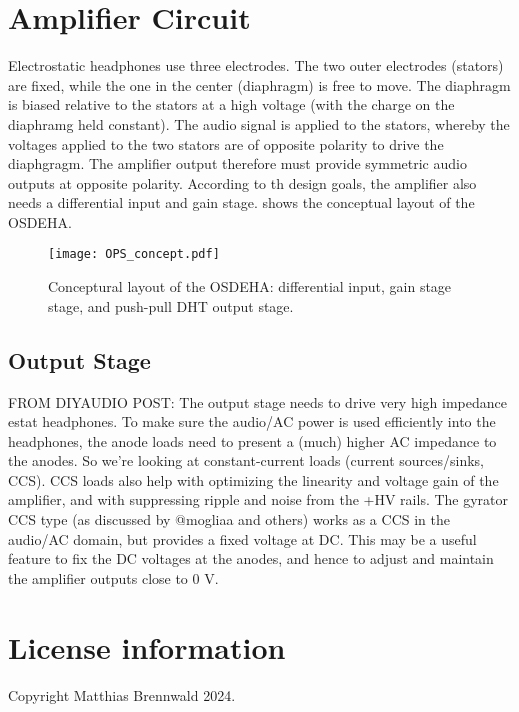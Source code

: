 \section{Amplifier Circuit}

Electrostatic headphones use three electrodes. The two outer electrodes (stators) are fixed, while the one in the center (diaphragm) is free to move. The diaphragm is biased relative to the stators at a high voltage (with the charge on the diaphramg held constant). The audio signal is applied to the stators, whereby the voltages applied to the two stators are of opposite polarity to drive the diaphgragm. The amplifier output therefore must provide symmetric audio outputs at opposite polarity. According to th design goals, the amplifier also needs a differential input and gain stage.  shows the conceptual layout of the OSDEHA.

\begin{figure}
\begin{center}
\texttt{[image: OPS\_concept.pdf]}
\caption{Conceptural layout of the OSDEHA: differential input, gain stage stage, and push-pull DHT output stage.}
\end{center}
\end{figure}


\subsection{Output Stage}
FROM DIYAUDIO POST:
    The output stage needs to drive very high impedance estat headphones. To make sure the audio/AC power is used efficiently into the headphones, the anode loads need to present a (much) higher AC impedance to the anodes. So we're looking at constant-current loads (current sources/sinks, CCS). CCS loads also help with optimizing the linearity and voltage gain of the amplifier, and with suppressing ripple and noise from the +HV rails.
    The gyrator CCS type (as discussed by @mogliaa and others) works as a CCS in the audio/AC domain, but provides a fixed voltage at DC. This may be a useful feature to fix the DC voltages at the anodes, and hence to adjust and maintain the amplifier outputs close to 0 V.


\section{License information}
Copyright Matthias Brennwald 2024.                                                    

